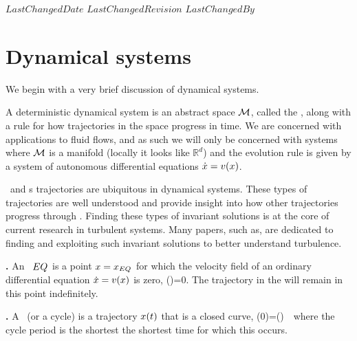 
{$LastChangedDate$}
{$LastChangedRevision$} {$LastChangedBy$}

    \ifarticle
    \else

\section{Dynamical systems}

We begin with a very brief discussion of dynamical systems.

A deterministic dynamical system is an abstract space ${\cal M}$, called the {\statesp}, along with a rule for how trajectories in the space progress in time. We are concerned with applications to fluid flows, and as such we will only be concerned with systems where ${\cal M}$ is a manifold (locally it looks like $\mathbb{R}^d$) and the evolution rule is given by a system of autonomous differential equations $\dot{x}=v(x)$.

\Eqva\ and \po s trajectories are ubiquitous in dynamical systems. These types of trajectories are well understood and provide insight into how other trajectories progress through {\statesp}. Finding these types of invariant solutions is at the core of current research in turbulent systems. Many papers, such as, are dedicated to finding and exploiting such invariant solutions to better understand turbulence.

\begin{definition}
\textbf{\Eqv.}
\label{def:eqva}
An \eqv\ $EQ_{}$ is a point $x=x_{EQ_{}}$ for which the
velocity field of an ordinary differential equation
$\dot{x} = v(x)$ is zero,
\beq
\vel(\ssp)=0.
\eeq
The trajectory in the {\statesp} will remain in this point indefinitely.
\end{definition}

\begin{definition}
\textbf{\Po.}
\label{def:po}
A \po\ (or a cycle) is a trajectory $x(t)$ that is a closed curve,
\beq
\ssp(0)=\ssp(\period{}) \,\, 
\eeq
where the cycle period \period{} is the shortest the shortest time for which this occurs.
\end{definition}

\subsection{\CLe}
	
